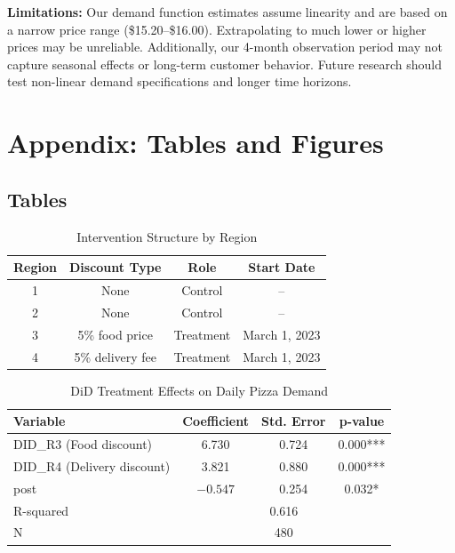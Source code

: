 \documentclass[12pt]{article}
\begin{document}
\textbf{Limitations:} Our demand function estimates assume linearity and are based on a narrow price range (\$15.20--\$16.00). Extrapolating to much lower or higher prices may be unreliable. Additionally, our 4-month observation period may not capture seasonal effects or long-term customer behavior. Future research should test non-linear demand specifications and longer time horizons.

\newpage
\appendix

\section{Appendix: Tables and Figures}

\subsection{Tables}

\begin{table}[H]
\centering
\caption{Intervention Structure by Region}
\label{tab:intervention}
\begin{tabular}{cccc}
\toprule
\textbf{Region} & \textbf{Discount Type} & \textbf{Role} & \textbf{Start Date} \\
\midrule
1 & None & Control & -- \\
2 & None & Control & -- \\
3 & 5\% food price & Treatment & March 1, 2023 \\
4 & 5\% delivery fee & Treatment & March 1, 2023 \\
\bottomrule
\end{tabular}
\end{table}

\begin{table}[H]
\centering
\caption{DiD Treatment Effects on Daily Pizza Demand}
\label{tab:did_results}
\begin{tabular}{lccc}
\toprule
\textbf{Variable} & \textbf{Coefficient} & \textbf{Std. Error} & \textbf{p-value} \\
\midrule
DID\_R3 (Food discount) & 6.730 & 0.724 & 0.000*** \\
DID\_R4 (Delivery discount) & 3.821 & 0.880 & 0.000*** \\
post & $-0.547$ & 0.254 & 0.032* \\
\midrule
R-squared & \multicolumn{3}{c}{0.616} \\
N & \multicolumn{3}{c}{480} \\
\bottomrule
\end{tabular}
\end{table}
\end{document}
